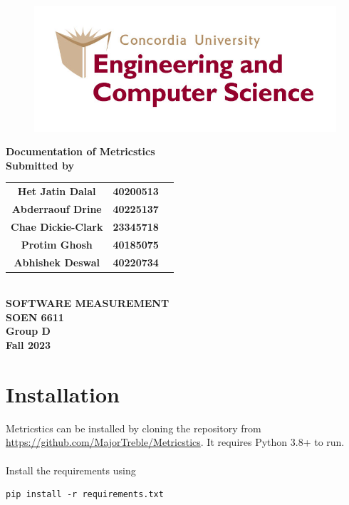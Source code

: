 \documentclass{article}
\begin{document}
\begin{figure}
    \centering
    \includegraphics[width=0.7\linewidth]{logoENCS.jpeg}
    \label{fig:example}
\end{figure}

\begin{center}
{\fontsize{16pt}{0pt}\selectfont \textbf{Documentation of Metricstics}} \\
  \vspace{20pt}
  {\fontsize{14pt}{0pt}\selectfont \textbf{Submitted by}}
  \\
\vspace{30pt}


\begin{large}
\begin{tabular}{ c c c }
 \textbf{Het Jatin Dalal}& \textbf{40200513} \\ 
  \textbf{Abderraouf Drine}& \textbf{40225137}  \\  
  \textbf{Chae Dickie-Clark} & \textbf{23345718}  \\ 
  \textbf{Protim Ghosh} & \textbf{40185075} \\
  \textbf{Abhishek Deswal} & \textbf{40220734} \\
\end{tabular}
\end{large}
\\
\vspace{100pt}
{\fontsize{14pt}{0pt}\selectfont \textbf{SOFTWARE MEASUREMENT}}\\
\vspace{20pt}
{\fontsize{14pt}{0pt}\selectfont \textbf{SOEN 6611}}
\\
\vspace{20pt}
{\fontsize{14pt}{0pt}\selectfont \textbf{Group D}}
\\
\vspace{130pt}
{\fontsize{14pt}{0pt}\selectfont \textbf{Fall 2023}}
\end{center}

\section{Installation}
    Metricstics can be installed by cloning the repository from \url{https://github.com/MajorTreble/Metricstics}. It requires Python 3.8+ to run.\\
    \\
Install the requirements using
\begin{lstlisting}
pip install -r requirements.txt
\end{lstlisting}
\end{document}
